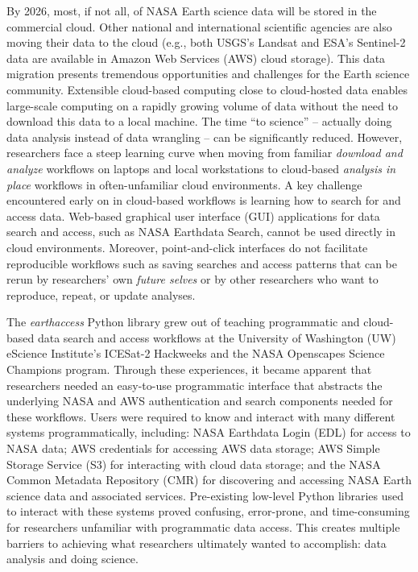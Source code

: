 \documentclass{ROSES-NASA-proposal}
\newcommand{\earthaccess}{\textit{earthaccess}\xspace} %
\begin{document}
By 2026, most, if not all, of NASA Earth science data will be stored in the commercial cloud. Other national and international scientific agencies are also moving their data to the cloud (e.g., both USGS's Landsat and ESA's Sentinel-2 data are available in Amazon Web Services (AWS) cloud storage). This data migration presents tremendous opportunities and challenges for the Earth science community. Extensible cloud-based computing close to cloud-hosted data enables large-scale computing on a rapidly growing volume of data without the need to download this data to a local machine. The time ``to science'' -- actually doing data analysis instead of data wrangling -- can be significantly reduced. However, researchers face a steep learning curve when moving from familiar \textit{download and analyze} workflows on laptops and local workstations to cloud-based \textit{analysis in place} workflows in often-unfamiliar cloud environments. A key challenge encountered early on in cloud-based workflows is learning how to search for and access data. Web-based graphical user interface (GUI) applications for data search and access, such as NASA Earthdata Search, cannot be used directly in cloud environments. Moreover, point-and-click interfaces do not facilitate reproducible workflows such as saving searches and access patterns that can be rerun by researchers' own \textit{future selves} \citep{lowndes_better_path_2017} or by other researchers who want to reproduce, repeat, or update analyses.

The \earthaccess Python library grew out of teaching programmatic and cloud-based data search and access workflows at the University of Washington (UW) eScience Institute's ICESat-2 Hackweeks and the NASA Openscapes Science Champions program. Through these experiences, it became apparent that researchers needed an easy-to-use programmatic interface that abstracts the underlying NASA and AWS authentication and search components needed for these workflows. Users were required to know and interact with many different systems programmatically, including: NASA Earthdata Login (EDL) for access to NASA data; AWS credentials for accessing AWS data storage; AWS Simple Storage Service (S3) for interacting with cloud data storage; and the NASA Common Metadata Repository (CMR) for discovering and accessing NASA Earth science data and associated services. Pre-existing low-level Python libraries used to interact with these systems proved confusing, error-prone, and time-consuming for researchers unfamiliar with programmatic data access. This creates multiple barriers to achieving what researchers ultimately wanted to accomplish: data analysis and doing science.
\end{document}
